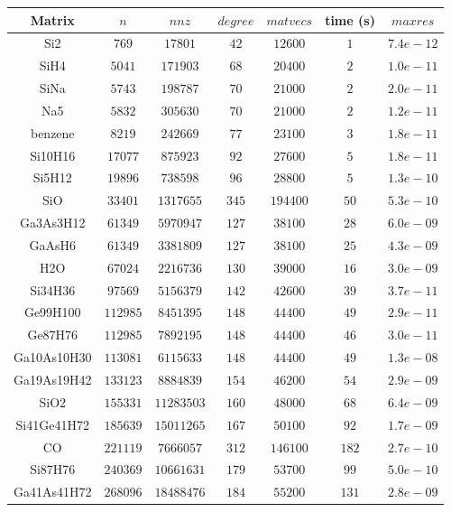 \begin{tabular}{c|c|c|c|c|c|c}
Matrix & $n$ & $nnz$ & $degree$ & $matvecs$ & time (s) & $maxres$ \\\hline
Si2 & $769$ & $17801$ & $42$ & $12600$ & $1$ & $7.4e-12$ \\
SiH4 & $5041$ & $171903$ & $68$ & $20400$ & $2$ & $1.0e-11$ \\
SiNa & $5743$ & $198787$ & $70$ & $21000$ & $2$ & $2.0e-11$ \\
Na5 & $5832$ & $305630$ & $70$ & $21000$ & $2$ & $1.2e-11$ \\
benzene & $8219$ & $242669$ & $77$ & $23100$ & $3$ & $1.8e-11$ \\
Si10H16 & $17077$ & $875923$ & $92$ & $27600$ & $5$ & $1.8e-11$ \\
Si5H12 & $19896$ & $738598$ & $96$ & $28800$ & $5$ & $1.3e-10$ \\
SiO & $33401$ & $1317655$ & $345$ & $194400$ & $50$ & $5.3e-10$ \\
Ga3As3H12 & $61349$ & $5970947$ & $127$ & $38100$ & $28$ & $6.0e-09$ \\
GaAsH6 & $61349$ & $3381809$ & $127$ & $38100$ & $25$ & $4.3e-09$ \\
H2O & $67024$ & $2216736$ & $130$ & $39000$ & $16$ & $3.0e-09$ \\
Si34H36 & $97569$ & $5156379$ & $142$ & $42600$ & $39$ & $3.7e-11$ \\
Ge99H100 & $112985$ & $8451395$ & $148$ & $44400$ & $49$ & $2.9e-11$ \\
Ge87H76 & $112985$ & $7892195$ & $148$ & $44400$ & $46$ & $3.0e-11$ \\
Ga10As10H30 & $113081$ & $6115633$ & $148$ & $44400$ & $49$ & $1.3e-08$ \\
Ga19As19H42 & $133123$ & $8884839$ & $154$ & $46200$ & $54$ & $2.9e-09$ \\
SiO2 & $155331$ & $11283503$ & $160$ & $48000$ & $68$ & $6.4e-09$ \\
Si41Ge41H72 & $185639$ & $15011265$ & $167$ & $50100$ & $92$ & $1.7e-09$ \\
CO & $221119$ & $7666057$ & $312$ & $146100$ & $182$ & $2.7e-10$ \\
Si87H76 & $240369$ & $10661631$ & $179$ & $53700$ & $99$ & $5.0e-10$ \\
Ga41As41H72 & $268096$ & $18488476$ & $184$ & $55200$ & $131$ & $2.8e-09$ \\
\end{tabular}